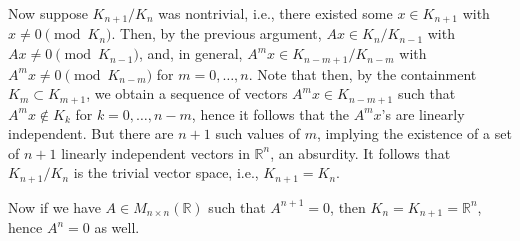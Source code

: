 \documentclass{article}
\begin{document}
\begin{enumerate}
\begin{enumerate}
Now suppose \(K_{n + 1} / K_n\) was nontrivial, i.e., there existed some \(x \in K_{n + 1}\) with \(x \neq 0 \pmod{K_n}\).  Then, by the previous argument, \(Ax \in K_n / K_{n - 1}\) with \(Ax \neq 0 \pmod{K_{n - 1}}\), and, in general, \(A^mx \in K_{n - m + 1} / K_{n - m}\) with \(A^mx \neq 0 \pmod{K_{n - m}}\) for \(m = 0, \ldots, n\).  Note that then, by the containment \(K_m \subset K_{m + 1}\), we obtain a sequence of vectors \(A^mx \in K_{n - m + 1}\) such that \(A^mx \notin K_k\) for \(k = 0, \ldots, n - m\), hence it follows that the \(A^mx\)'s are linearly independent.  But there are \(n + 1\) such values of \(m\), implying the existence of a set of \(n + 1\) linearly independent vectors in \(\mathbb{R}^n\), an absurdity.  It follows that \(K_{n + 1} / K_n\) is the trivial vector space, i.e., \(K_{n + 1} = K_n\).

Now if we have \(A \in M_{n \times n}(\mathbb{R})\) such that \(A^{n + 1} = 0\), then \(K_n = K_{n + 1} = \mathbb{R}^n\), hence \(A^n = 0\) as well.

\end{enumerate}



\end{enumerate}
\end{document}
